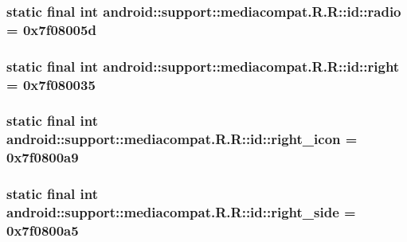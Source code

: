 \hypertarget{classandroid_1_1support_1_1mediacompat_1_1_r_1_1id_f487c5f06ff9e8d8b005d803347a3b8f}{
\subsubsection[{radio}]{\setlength{\rightskip}{0pt plus 5cm}static final int android::support::mediacompat.R.R::id::radio = 0x7f08005d}}
\label{classandroid_1_1support_1_1mediacompat_1_1_r_1_1id_f487c5f06ff9e8d8b005d803347a3b8f}


\hypertarget{classandroid_1_1support_1_1mediacompat_1_1_r_1_1id_a962addb902c6db0e8b9d4f565c0138a}{
\subsubsection[{right}]{\setlength{\rightskip}{0pt plus 5cm}static final int android::support::mediacompat.R.R::id::right = 0x7f080035}}
\label{classandroid_1_1support_1_1mediacompat_1_1_r_1_1id_a962addb902c6db0e8b9d4f565c0138a}


\hypertarget{classandroid_1_1support_1_1mediacompat_1_1_r_1_1id_84c2383643d0d19e74397891620ff513}{
\subsubsection[{right\_\-icon}]{\setlength{\rightskip}{0pt plus 5cm}static final int android::support::mediacompat.R.R::id::right\_\-icon = 0x7f0800a9}}
\label{classandroid_1_1support_1_1mediacompat_1_1_r_1_1id_84c2383643d0d19e74397891620ff513}


\hypertarget{classandroid_1_1support_1_1mediacompat_1_1_r_1_1id_33df8552b2873dc16c67af84010351c8}{
\subsubsection[{right\_\-side}]{\setlength{\rightskip}{0pt plus 5cm}static final int android::support::mediacompat.R.R::id::right\_\-side = 0x7f0800a5}}
\label{classandroid_1_1support_1_1mediacompat_1_1_r_1_1id_33df8552b2873dc16c67af84010351c8}


